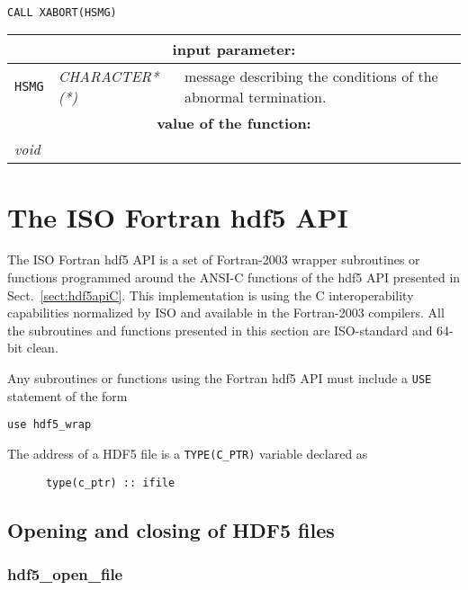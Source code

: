 \begin{verbatim}

CALL XABORT(HSMG)
\end{verbatim}

\noindent
\begin{tabular}{|p{1.5cm}|p{3cm}|p{10cm}|}
\hline
\multicolumn{3}{|c|}{\bf input parameter:} \\
\hline
{\tt HSMG} & {\it CHARACTER*(*)} & message describing the conditions of the abnormal termination. \\
\hline
\multicolumn{3}{|c|}{\bf value of the function:} \\
\hline
\multicolumn{2}{|l|}{\it void} &  \\
\hline
\end{tabular}

\clearpage

\section {The ISO Fortran {\sc hdf5} API}

The ISO Fortran {\sc hdf5} API is a set of Fortran-2003 wrapper subroutines or functions programmed around the ANSI-C functions of the {\sc hdf5} API presented in Sect.~\ref{sect:hdf5apiC}. This implementation is using
the C interoperability capabilities normalized by ISO and available in the Fortran-2003 compilers. All the subroutines and functions presented in this section are ISO-standard and 64-bit clean.

\vskip 0.08cm

Any subroutines or functions using the Fortran {\sc hdf5} API must include a {\tt USE} statement of the form
\begin{verbatim}
use hdf5_wrap
\end{verbatim}

The address of a HDF5 file is a {\tt TYPE(C\_PTR)} variable declared as
\begin{verbatim}
      type(c_ptr) :: ifile
\end{verbatim}

\subsection{Opening and closing of HDF5 files}

\subsubsection{hdf5\_open\_file}

